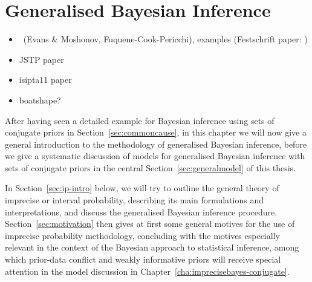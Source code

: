 \chapter{Generalised Bayesian Inference}
\label{cha:gbi}

\begin{itemize}
\item \pdc\ (Evans \& Moshonov, Fuquene-Cook-Pericchi), examples (Festschrift paper: \cite{Walter2010a})
\item JSTP paper \cite{Walter2009a}
\item isipta11 paper \cite{Walter2011a}
\item boatshape?
\end{itemize}



After having seen a detailed example for Bayesian inference using sets of conjugate priors in Section~\ref{sec:commoncause},
in this chapter we will now give a general introduction to the methodology of generalised Bayesian inference,
before we give a systematic discussion of models for generalised Bayesian inference with sets of conjugate priors
in the central Section~\ref{sec:generalmodel} of this thesis.

In Section~\ref{sec:ip-intro} below, we will try to outline the general theory of imprecise or interval probability,
describing its main formulations and interpretations, and discuss the generalised Bayesian inference procedure.
Section~\ref{sec:motivation} then gives at first some general motives for the use of imprecise probability methodology,
concluding with the motives especially relevant in the context of the Bayesian approach to statistical inference,
among which prior-data conflict and weakly informative priors will receive special attention
in the model discussion in Chapter~\ref{cha:imprecisebayes-conjugate}.

